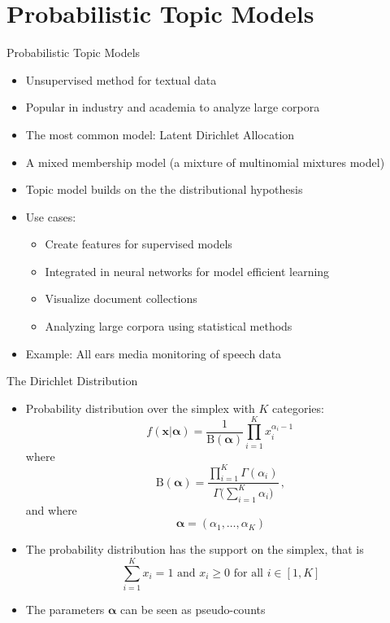 \documentclass[10pt]{beamer}
\begin{document}
\section{Probabilistic Topic Models}
\frame{\sectionpage}

\frame{\sectionpage}

\begin{frame}{Probabilistic Topic Models}

\begin{itemize}
    \item Unsupervised method for {\color{uured} textual data}\pause
    \item Popular in industry and academia to {\color{uured} analyze large corpora}\pause
    \item The most common model: {\color{uured} Latent Dirichlet Allocation}
    \item A {\color{uured} mixed membership} model (a mixture of multinomial mixtures model)\pause
    \item Topic model builds on the the {\color{uured} distributional hypothesis}\pause
    \item Use cases:
    \begin{itemize}
        \item Create features for supervised models\pause
        \item Integrated in neural networks for model efficient learning\pause
        \item Visualize document collections\pause
        \item Analyzing large corpora using statistical methods\pause
    \end{itemize}
    \item Example: {\color{uured} All ears} media monitoring of speech data
\end{itemize}
\end{frame}



\begin{frame}{The Dirichlet Distribution}

\begin{itemize}
    \item Probability distribution over the simplex with $K$ categories:
\[
f({\boldsymbol {x} }| {\boldsymbol {\alpha }}) = {\frac {1}{\mathrm {B} ({\boldsymbol {\alpha }})}} \prod _{i=1}^{K}x_{i}^{\alpha _{i}-1}\,
\]
where
\[
{\displaystyle \mathrm {B} ({\boldsymbol {\alpha }})={\frac {\prod _{i=1}^{K}\Gamma (\alpha _{i})}{\Gamma {\bigl (}\sum _{i=1}^{K}\alpha _{i}{\bigr )}}}}\,,
\]
and where
\[
{\displaystyle {\boldsymbol {\alpha }}=(\alpha _{1},\ldots ,\alpha _{K})}
\]\pause
\item The probability distribution has the support on the simplex, that is
\[
    \sum_{i=1}^{K}x_{i}=1{\text{ and }}x_{i}\geq 0{\text{ for all }} i\in [1,K]
\]
\pause
\item The parameters ${\boldsymbol {\alpha }}$ can be seen as {\color{uured} pseudo-counts}
\end{itemize}
\end{frame}
\end{document}
